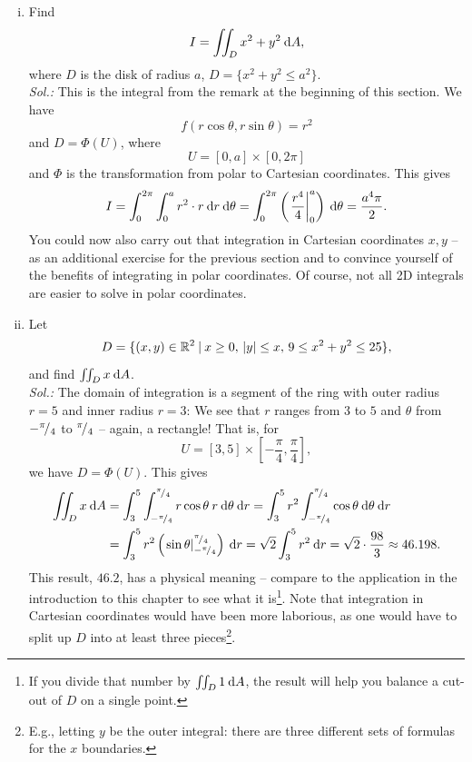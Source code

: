 \begin{example}
\begin{enumerate}[(i)]
	\item Find 
	\[ I = \iint_D x^2+y^2 \: \mathrm{d} A, \]
	where $D$ is the disk of radius $a$, $D=\{x^2+y^2 \leq a^2\}$. \\
	{\it Sol.:}
	This is the integral from the remark at the beginning of this section. We have
	\[ f(r\cos\theta,r\sin\theta) = r^2 \]
	and $D=\Phi(U)$, where
	\[ U = [0,a]\times[0,2\pi] \]
	and $\Phi$ is the transformation from polar to Cartesian coordinates. This gives
	\[  I = \int_{0}^{2\pi} \int_{0}^{a} r^2 \cdot r \: \mathrm{d} r \: \mathrm{d} \theta
		  = \int_{0}^{2\pi} \left( \left. \frac{r^4}{4}\right|_0^a \right) \: \mathrm{d} \theta
		  = \frac{a^4\pi}{2}.\]
	You could now also carry out that integration in Cartesian coordinates $x,y$ -- as an additional exercise for the previous section and to convince yourself of the benefits of integrating in polar coordinates. Of course, not all 2D integrals are easier to solve in polar coordinates.
	\item Let
	\[ D = \{ (x,y)\in\mathbb{R}^2 \: 
					| \: x\geq 0, \, \left| y \right|\leq x, \, 9 \leq x^2+y^2 \leq 25 \}, \]
	and find $\iint_D x \: \mathrm{d} A$. \\
	{\it Sol.:}
	The domain of integration is a segment of the ring with outer radius $r=5$ and inner radius $r=3$:
	We see that $r$ ranges from $3$ to $5$ and $\theta$ from $-{}^{\pi}\!/_{4}$ to ${}^{\pi}\!/_{4}$ -- again, a rectangle! That is, for 
	\[ U = \left[3,5\right]\times\left[-\frac{\pi}{4},\frac{\pi}{4}\right], \]
	we have $D=\Phi(U)$. This gives
	\begin{equation*}
	\begin{split}
\iint_D x \: \mathrm{d} A 
& = \int_{3}^{5} \int_{-{}^{\pi}\!/_{4}}^{{}^{\pi}\!/_{4}} r\cos\theta \: r \: \mathrm{d} \theta \: \mathrm{d} r 
 = \int_{3}^{5} r^2\int_{-{}^{\pi}\!/_{4}}^{{}^{\pi}\!/_{4}} \cos\theta \: \mathrm{d} \theta \: \mathrm{d} r \\
& = \int_{3}^{5} r^2\left(\left.\sin\theta\right|_{-{}^{\pi}\!/_{4}}^{{}^{\pi}\!/_{4}}\right) \: \mathrm{d} r
 = \sqrt{2}\int_{3}^{5} r^2 \: \mathrm{d} r = \sqrt{2}\cdot\frac{98}{3} \approx 46.198.
	\end{split}
	\end{equation*}
	This result, $46.2$, has a physical meaning -- compare to the application in the introduction to this chapter to see what it is\footnote{If you divide that number by $\iint_D 1 \: \mathrm{d} A$, the result will help you balance a cut-out of $D$ on a single point.}. Note that integration in Cartesian coordinates would have been more laborious, as one would have to split up $D$ into at least three pieces\footnote{E.g., letting $y$ be the outer integral: there are three different sets of formulas for the $x$ boundaries.}. 

\end{enumerate}
\end{example}
